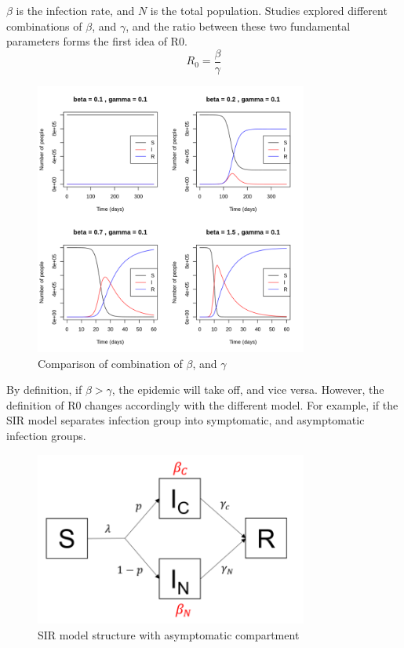 \documentclass[a4paper, 12pt, twoside]{report}
\begin{document}
$\beta$ is the infection rate, and $N$ is the total population.
Studies explored different combinations of $\beta$, and $\gamma$, and the ratio between these two fundamental parameters forms the first idea of \gls{R0}.
\begin{equation}
	R_0 = \frac{\beta}{\gamma}
\end{equation}
\begin{figure}[htpb]
	\centering
	\includegraphics[width=0.8\textwidth]{sir-model-beta-gamma}
	\caption{Comparison of combination of $\beta$, and $\gamma$}
	\label{fig:sir-model-beta-gamma}
\end{figure}

By definition, if $\beta > \gamma$, the epidemic will take off, and vice versa.
However, the definition of \gls{R0} changes accordingly with the different model.
For example, if the SIR model separates infection group into symptomatic, and asymptomatic infection groups.
\begin{figure}[htpb]
	\centering
	\includegraphics[width=0.8\textwidth]{sir-model-asymptomatic}
	\caption{SIR model structure with asymptomatic compartment}
	\label{fig:sir_model_structure_with_asymptomatic_compartment}
\end{figure}
\end{document}
